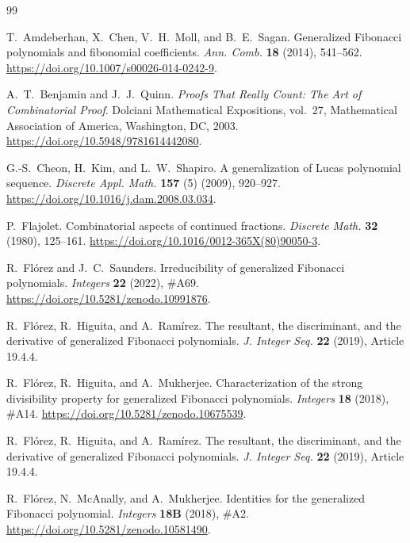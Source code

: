 \documentclass[11pt]{amsart}
\theoremstyle{plain}
\numberwithin{equation}{section}
\begin{document}
\begin{thebibliography}{99}

T.~Amdeberhan, X.~Chen, V.~H.~Moll, and B.~E.~Sagan.
\newblock Generalized Fibonacci polynomials and fibonomial coefficients.
\newblock \emph{Ann. Comb.} \textbf{18} (2014), 541--562.
\newblock \url{https://doi.org/10.1007/s00026-014-0242-9}.



A.~T.~Benjamin and J.~J.~Quinn.
\newblock \emph{Proofs That Really Count: The Art of Combinatorial Proof}.
\newblock Dolciani Mathematical Expositions, vol.~27,
Mathematical Association of America, Washington, DC, 2003.
\newblock \url{https://doi.org/10.5948/9781614442080}.

G.-S.~Cheon, H.~Kim, and L.~W.~Shapiro.
\newblock A generalization of Lucas polynomial sequence.
\newblock \emph{Discrete Appl. Math.} \textbf{157} (5) (2009), 920--927.
\newblock \url{https://doi.org/10.1016/j.dam.2008.03.034}.

P.~Flajolet.
\newblock Combinatorial aspects of continued fractions.
\newblock \emph{Discrete Math.} \textbf{32} (1980), 125--161.
\newblock \url{https://doi.org/10.1016/0012-365X(80)90050-3}.

R.~Fl\'orez and J.~C.~Saunders.
\newblock Irreducibility of generalized Fibonacci polynomials.
\newblock \emph{Integers} \textbf{22} (2022), \#A69.
\newblock \url{https://doi.org/10.5281/zenodo.10991876}.

R.~Fl\'orez, R.~Higuita, and A.~Ram\'irez.
\newblock The resultant, the discriminant, and the derivative of generalized
Fibonacci polynomials.
\newblock \emph{J. Integer Seq.} \textbf{22} (2019), Article 19.4.4.

R.~Fl\'orez, R.~Higuita, and A.~Mukherjee.
\newblock Characterization of the strong divisibility property for generalized
Fibonacci polynomials.
\newblock \emph{Integers} \textbf{18} (2018), \#A14.
\newblock \url{https://doi.org/10.5281/zenodo.10675539}.


R.~Fl\'orez, R.~Higuita, and A.~Ram\'irez.
\newblock The resultant, the discriminant, and the derivative of generalized
Fibonacci polynomials.
\newblock \emph{J. Integer Seq.} \textbf{22} (2019), Article 19.4.4.

R.~Fl\'orez, N.~McAnally, and A.~Mukherjee.
\newblock Identities for the generalized Fibonacci polynomial.
\newblock \emph{Integers} \textbf{18B} (2018), \#A2.
\newblock \url{https://doi.org/10.5281/zenodo.10581490}.


\end{thebibliography}
\end{document}
